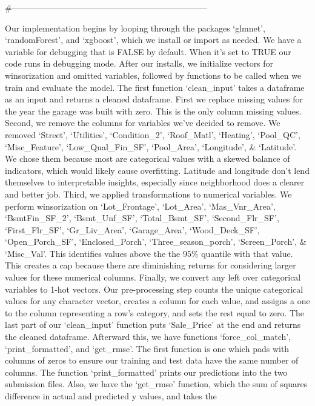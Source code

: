 \documentclass[
]{article}
\begin{document}
\#---------------------------------------------------------------------

Our implementation begins by looping through the packages `glmnet',
`randomForest', and `xgboost', which we install or import as needed. We
have a variable for debugging that is FALSE by default. When it's set to
TRUE our code runs in debugging mode. After our installs, we initialize
vectors for winsorization and omitted variables, followed by functions
to be called when we train and evaluate the model. The first function
`clean\_input' takes a dataframe as an input and returns a cleaned
dataframe. First we replace missing values for the year the garage was
built with zero. This is the only column missing values. Second, we
remove the columns for variables we've decided to remove. We removed
`Street', `Utilities', `Condition\_2', `Roof\_Matl', `Heating',
`Pool\_QC', `Misc\_Feature', `Low\_Qual\_Fin\_SF', `Pool\_Area',
`Longitude', \& `Latitude'. We chose them because most are categorical
values with a skewed balance of indicators, which would likely cause
overfitting. Latitude and longitude don't lend themselves to
interpretable insights, especially since neighborhood does a clearer and
better job. Third, we applied transformations to numerical variables. We
perform winsorization on `Lot\_Frontage', `Lot\_Area', `Mas\_Vnr\_Area',
`BsmtFin\_SF\_2', `Bsmt\_Unf\_SF', `Total\_Bsmt\_SF', `Second\_Flr\_SF',
`First\_Flr\_SF', `Gr\_Liv\_Area', `Garage\_Area', `Wood\_Deck\_SF',
`Open\_Porch\_SF', `Enclosed\_Porch', `Three\_season\_porch',
`Screen\_Porch', \& `Misc\_Val'. This identifies values above the the
95\% quantile with that value. This creates a cap because there are
diminishing returns for considering larger values for these numerical
columns. Finally, we convert any left over categorical variables to
1-hot vectors. Our pre-processing step counts the unique categorical
values for any character vector, creates a column for each value, and
assigns a one to the column representing a row's category, and sets the
rest equal to zero. The last part of our `clean\_input' function puts
`Sale\_Price' at the end and returns the cleaned dataframe. Afterward
this, we have functions `force\_col\_match', `print\_formatted', and
`get\_rmse'. The first function is one which pads with columns of zeros
to ensure our training and test data have the same number of columns.
The function `print\_formatted' prints our predictions into the two
submission files. Also, we have the `get\_rmse' function, which the sum
of squares difference in actual and predicted y values, and takes the
\end{document}
